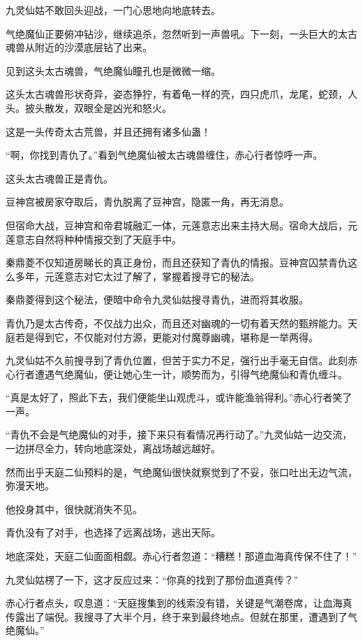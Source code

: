 \begin{this_body}
九灵仙姑不敢回头迎战，一门心思地向地底转去。

气绝魔仙正要俯冲钻沙，继续追杀，忽然听到一声兽吼。下一刻，一头巨大的太古魂兽从附近的沙漠底层钻了出来。

见到这头太古魂兽，气绝魔仙瞳孔也是微微一缩。

这头太古魂兽形状奇异，姿态狰狞，有着龟一样的壳，四只虎爪，龙尾，蛇颈，人头。披头散发，双眼全是凶光和怒火。

这是一头传奇太古荒兽，并且还拥有诸多仙蛊！

“啊，你找到青仇了。”看到气绝魔仙被太古魂兽缠住，赤心行者惊呼一声。

这头太古魂兽正是青仇。

豆神宫被房家夺取后，青仇脱离了豆神宫，隐匿一角，再无消息。

但宿命大战，豆神宫和帝君城融汇一体，元莲意志出来主持大局。宿命大战后，元莲意志自然将种种情报交到了天庭手中。

秦鼎菱不仅知道房睇长的真正身份，而且还获知了青仇的情报。豆神宫囚禁青仇这么多年，元莲意志对它太过了解了，掌握着搜寻它的秘法。

秦鼎菱得到这个秘法，便暗中命令九灵仙姑搜寻青仇，进而将其收服。

青仇乃是太古传奇，不仅战力出众，而且还对幽魂的一切有着天然的甄辨能力。天庭若是得到它，不仅能对付方源，更能对付魔尊幽魂，堪称是一举两得。

九灵仙姑不久前搜寻到了青仇位置，但苦于实力不足，强行出手毫无自信。此刻赤心行者遭遇气绝魔仙，便让她心生一计，顺势而为，引得气绝魔仙和青仇缠斗。

“真是太好了，照此下去，我们便能坐山观虎斗，或许能渔翁得利。”赤心行者笑了一声。

“青仇不会是气绝魔仙的对手，接下来只有看情况再行动了。”九灵仙姑一边交流，一边拼尽全力，转向地底深处，离战场越远越好。

然而出乎天庭二仙预料的是，气绝魔仙很快就察觉到了不妥，张口吐出无边气流，弥漫天地。

他投身其中，很快就消失不见。

青仇没有了对手，也选择了远离战场，逃出天际。

地底深处，天庭二仙面面相觑。赤心行者忽道：“糟糕！那道血海真传保不住了！”

九灵仙姑楞了一下，这才反应过来：“你真的找到了那份血道真传？”

赤心行者点头，叹息道：“天庭搜集到的线索没有错，关键是气潮卷席，让血海真传露出了端倪。我搜寻了大半个月，终于来到最终地点。但就在那里，遭遇到了气绝魔仙。”


\end{this_body}

